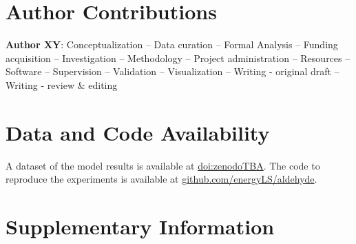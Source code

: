 \documentclass[5p]{elsarticle}
\begin{document}
\section*{Author Contributions}


\textbf{Author XY}:
Conceptualization --
Data curation --
Formal Analysis --
Funding acquisition --
Investigation --
Methodology --
Project administration --
Resources --
Software --
Supervision --
Validation --
Visualization --
Writing - original draft --
Writing - review \& editing


\section*{Data and Code Availability}

A dataset of the model results is available at \href{zenodoTBA}{doi:zenodoTBA}.
The code to reproduce the experiments is available at \href{https://github.com/energyLS/aldehyde}{github.com/energyLS/aldehyde}.



\renewcommand{\ttdefault}{\sfdefault}



\newpage

\makeatletter
\renewcommand \thesection{S\@arabic\c@section}
\renewcommand\thetable{S\@arabic\c@table}
\renewcommand \thefigure{S\@arabic\c@figure}
\makeatother
\renewcommand{\citenumfont}[1]{S#1}
\setcounter{equation}{0}
\setcounter{figure}{0}
\setcounter{table}{0}
\setcounter{section}{0}


\section{Supplementary Information}
\label{sec:si}
 





\renewcommand{\ttdefault}{\sfdefault}
\end{document}
